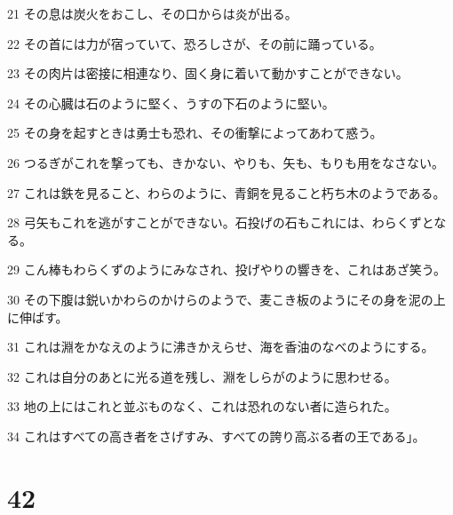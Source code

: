 \par 21 その息は炭火をおこし、その口からは炎が出る。
\par 22 その首には力が宿っていて、恐ろしさが、その前に踊っている。
\par 23 その肉片は密接に相連なり、固く身に着いて動かすことができない。
\par 24 その心臓は石のように堅く、うすの下石のように堅い。
\par 25 その身を起すときは勇士も恐れ、その衝撃によってあわて惑う。
\par 26 つるぎがこれを撃っても、きかない、やりも、矢も、もりも用をなさない。
\par 27 これは鉄を見ること、わらのように、青銅を見ること朽ち木のようである。
\par 28 弓矢もこれを逃がすことができない。石投げの石もこれには、わらくずとなる。
\par 29 こん棒もわらくずのようにみなされ、投げやりの響きを、これはあざ笑う。
\par 30 その下腹は鋭いかわらのかけらのようで、麦こき板のようにその身を泥の上に伸ばす。
\par 31 これは淵をかなえのように沸きかえらせ、海を香油のなべのようにする。
\par 32 これは自分のあとに光る道を残し、淵をしらがのように思わせる。
\par 33 地の上にはこれと並ぶものなく、これは恐れのない者に造られた。
\par 34 これはすべての高き者をさげすみ、すべての誇り高ぶる者の王である」。

\chapter{42}

